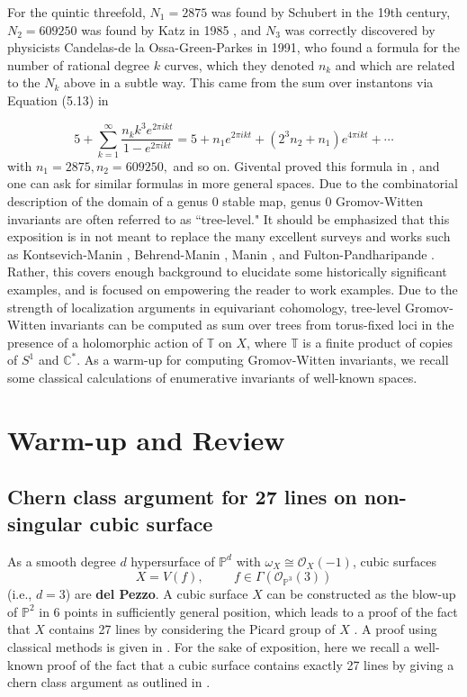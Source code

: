 \documentclass{amsart}
\newcommand{\PP}{\mathbb{P}}\newcommand{\A}{\mathbb{A}}\newcommand{\Z}{\mathbb{Z}}\newcommand{\C}{\mathbb{C}}\newcommand{\N}{\mathbb{N}}\newcommand{\T}{\mathbb{T}}
\begin{document}
For the quintic threefold, $N_1=2875$ was found by Schubert in the 19th century, $N_2=609250$ was found by Katz in 1985 \cite{katzenumerative}, and $N_3$ was correctly discovered by physicists Candelas-de la Ossa-Green-Parkes \cite{CANDELAS199121} in 1991, who found a formula for the number of rational degree $k$ curves, which they denoted $n_k$ and which are related to the $N_k$ above in a subtle way. This came from the sum over instantons via Equation (5.13) in \cite{CANDELAS199121}

\[ 5 + \sum_{k=1}^\infty \frac{n_k k^3 e^{2\pi i k t}}{1 - e^{2\pi i k t}} = 5 + n_1 e^{2\pi i k t} + (2^3n_2 + n_1) e^{4\pi i k t} + \cdots \] with $n_1 = 2875, n_2 = 609250,$ and so on. Givental proved this formula in \cite{givental1998mirrorformulaquinticthreefolds}, and one can ask for similar formulas in more general spaces. Due to the combinatorial description of the domain of a genus $0$ stable map, genus $0$ Gromov-Witten invariants are often referred to as ``tree-level." It should be emphasized that this exposition is in not meant to replace the many excellent surveys and works such as Kontsevich-Manin \cite{KontsevichManin_1994}, Behrend-Manin \cite{behrend1995stacksstablemapsgromovwitten}, Manin \cite{maninfrobenius}, and Fulton-Pandharipande \cite{fulton1997notesstablemapsquantum}. Rather, this covers enough background to elucidate some historically significant examples, and is focused on empowering the reader to work examples. Due to the strength of localization arguments in equivariant cohomology, tree-level Gromov-Witten invariants can be computed as sum over trees from torus-fixed loci in the presence of a holomorphic action of $\mathbb{T}$ on $X$, where $\mathbb{T}$ is a finite product of copies of $S^1$ and $\C^*$. As a warm-up for computing Gromov-Witten invariants, we recall some classical calculations of enumerative invariants of well-known spaces. 




\section{Warm-up and Review}
\subsection{Chern class argument for 27 lines on non-singular cubic surface} 

\label{chernclassCubicSurface}

As a smooth degree $d$ hypersurface of $\PP^d$ with $\omega_X \cong \mathcal{O}_X(-1)$, cubic surfaces 
 \[ X = V(f), \hspace{1cm} f\in \Gamma( \mathcal{O}_{\PP^3}(3)) \] (i.e., $d=3$) are \textbf{del Pezzo}. A cubic surface $X$ can be constructed as the blow-up of $\PP^2$ in 6 points in sufficiently general position, which leads to a proof of the fact that $X$ contains 27 lines by considering the Picard group of $X$  \cite{hartshorne.alg.geom}. A proof using classical methods is given in \cite{reid2009undergraduate}. For the sake of exposition, here we recall a well-known proof of the fact that a cubic surface contains exactly 27 lines by giving a chern class argument as outlined in \cite{eisenbud20163264}. \\
\end{document}
